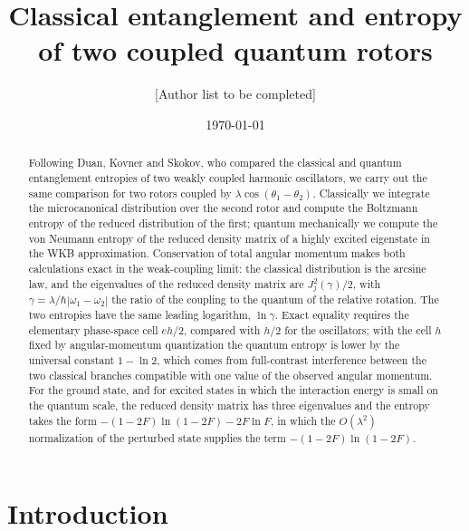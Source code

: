\documentclass[aps,preprint,12pt,superscriptaddress,nofootinbib]{revtex4-2}
\begin{document}
\title{Classical entanglement and entropy of two coupled quantum rotors}

\author{[Author list to be completed]}
\affiliation{[Affiliation]}

\date{\today}

\begin{abstract}
Following Duan, Kovner and Skokov, who compared the classical and quantum
entanglement entropies of two weakly coupled harmonic oscillators, we carry out
the same comparison for two rotors coupled by $\lambda\cos(\theta_{1}-\theta_{2})$.
Classically we integrate the microcanonical distribution over the second rotor and
compute the Boltzmann entropy of the reduced distribution of the first; quantum
mechanically we compute the von Neumann entropy of the reduced density matrix of a
highly excited eigenstate in the WKB approximation. Conservation of total angular
momentum makes both calculations exact in the weak-coupling limit: the classical
distribution is the arcsine law, and the eigenvalues of the reduced density matrix
are $J_{j}^{2}(\gamma)/2$, with $\gamma=\lambda/\hbar|\omega_{1}-\omega_{2}|$ the
ratio of the coupling to the quantum of the relative rotation. The two entropies
have the same leading logarithm, $\ln\gamma$. Exact equality requires the elementary
phase-space cell $eh/2$, compared with $h/2$ for the oscillators; with the cell $h$
fixed by angular-momentum quantization the quantum entropy is lower by the
universal constant $1-\ln2$, which comes from full-contrast interference between the
two classical branches compatible with one value of the observed angular momentum.
For the ground state, and for excited states in which the interaction energy is
small on the quantum scale, the reduced density matrix has three eigenvalues and
the entropy takes the form $-(1-2F)\ln(1-2F)-2F\ln F$, in which the
$O(\lambda^{2})$ normalization of the perturbed state supplies the term
$-(1-2F)\ln(1-2F)$.
\end{abstract}

\maketitle

\section{Introduction}
\label{sec:intro}
\end{document}
